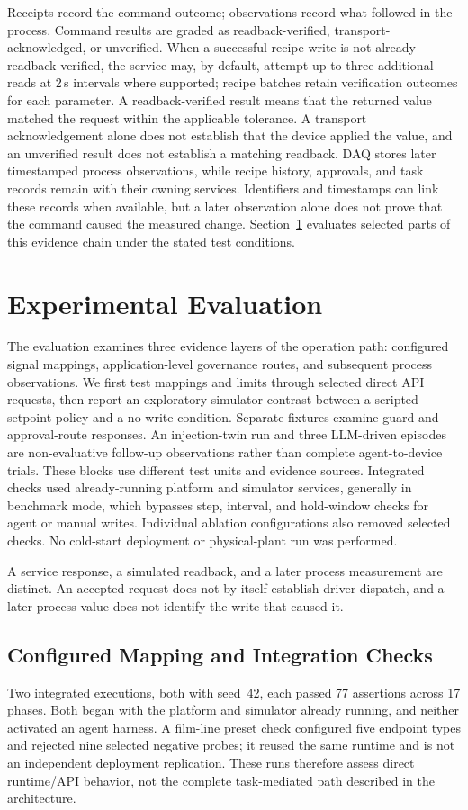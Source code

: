 \documentclass[journal]{IEEEtran}
\begin{document}
Receipts record the command outcome; observations record what followed in
the process. Command results are graded as readback-verified,
transport-acknowledged, or unverified. When a successful recipe write is not
already readback-verified, the service may, by default, attempt up to three additional
reads at 2\,s intervals where supported; recipe batches retain verification
outcomes for each parameter. A readback-verified result means that the
returned value matched the request within the applicable tolerance. A transport acknowledgement alone does not
establish that the device applied the value, and an unverified result does
not establish a matching readback. DAQ stores later timestamped process
observations, while recipe history, approvals, and task records remain with
their owning services. Identifiers and timestamps can link these records
when available, but a later observation alone does not prove that the command
caused the measured change. Section~\ref{sec:eval} evaluates selected parts
of this evidence chain under the stated test conditions.

  \section{Experimental Evaluation}
\label{sec:eval}
The evaluation examines three evidence layers of the operation path: configured signal mappings, application-level governance routes, and subsequent process observations. We first test mappings and limits through selected direct API requests, then report an exploratory simulator contrast between a scripted setpoint policy and a no-write condition. Separate fixtures examine guard and approval-route responses. An injection-twin run and three LLM-driven episodes are non-evaluative follow-up observations rather than complete agent-to-device trials. These blocks use different test units and evidence sources. Integrated checks used already-running platform and simulator services, generally in benchmark mode, which bypasses step, interval, and hold-window checks for agent or manual writes. Individual ablation configurations also removed selected checks. No cold-start deployment or physical-plant run was performed.

A service response, a simulated readback, and a later process measurement are distinct. An accepted request does not by itself establish driver dispatch, and a later process value does not identify the write that caused it.

\subsection{Configured Mapping and Integration Checks}
\label{sec:eval-mapping}
Two integrated executions, both with seed~42, each passed 77 assertions across 17 phases. Both began with the platform and simulator already running, and neither activated an agent harness. A film-line preset check configured five endpoint types and rejected nine selected negative probes; it reused the same runtime and is not an independent deployment replication. These runs therefore assess direct runtime/API behavior, not the complete task-mediated path described in the architecture.
\end{document}
